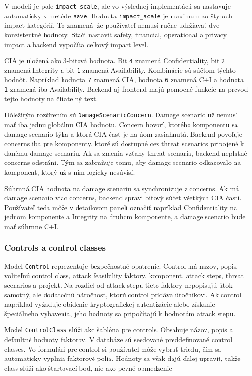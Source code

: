 \documentclass[11pt]{article}
\begin{document}
V modeli je pole \texttt{impact\_scale}, ale vo výslednej implementácii sa nastavuje automaticky v metóde \texttt{save}. Hodnota \texttt{impact\_scale} je maximum zo štyroch impact kategórií. To znamená, že používateľ nemusí ručne udržiavať dve konzistentné hodnoty. Stačí nastaviť safety, financial, operational a privacy impact a backend vypočíta celkový impact level.

CIA je uložená ako 3-bitová hodnota. Bit \texttt{4} znamená Confidentiality, bit \texttt{2} znamená Integrity a bit \texttt{1} znamená Availability. Kombinácie sú súčtom týchto hodnôt. Napríklad hodnota \texttt{7} znamená CIA, hodnota \texttt{6} znamená C+I a hodnota \texttt{1} znamená iba Availability. Backend aj frontend majú pomocné funkcie na prevod tejto hodnoty na čitateľný text.

Dôležitým rozšírením sú \texttt{DamageScenarioConcern}. Damage scenario už nemusí mať iba jednu globálnu CIA hodnotu. Concern hovorí, ktorého komponentu sa damage scenario týka a ktorá CIA časť je na ňom zasiahnutá. Backend povoľuje concerns iba pre komponenty, ktoré sú dostupné cez threat scenarios pripojené k danému damage scenariu. Ak sa zmenia vzťahy threat scenaria, backend neplatné concerns odstráni. Tým sa zabraňuje tomu, aby damage scenario odkazovalo na komponent, ktorý už s ním logicky nesúvisí.

Súhrnná CIA hodnota na damage scenariu sa synchronizuje z concerns. Ak má damage scenario viac concerns, backend spraví bitový súčet všetkých CIA častí. Používateľ teda môže v detailovom paneli označiť napríklad Confidentiality na jednom komponente a Integrity na druhom komponente, a damage scenario bude mať súhrnne C+I.

\subsubsection{Controls a control classes}

Model \texttt{Control} reprezentuje bezpečnostné opatrenie. Control má názov, popis, voliteľnú control class, attack feasibility faktory, komponent, attack steps, threat scenarios a projekt. Na rozdiel od attack stepu tieto faktory nepopisujú útok samotný, ale dodatočnú náročnosť, ktorú control pridáva útočníkovi. Ak control napríklad vyžaduje obídenie kryptografickej autentizácie alebo získanie špeciálneho vybavenia, jeho hodnoty sa pripočítajú k hodnotám attack stepu.

Model \texttt{ControlClass} slúži ako šablóna pre controls. Obsahuje názov, popis a defaultné hodnoty faktorov. V databáze sú seedované preddefinované control classes. Vo formulári pre control si používateľ môže vybrať triedu, čím sa automaticky vyplnia faktorové polia. Hodnoty sa však dajú ďalej upraviť, takže class slúži ako štartovací bod, nie ako pevné obmedzenie.
\end{document}
